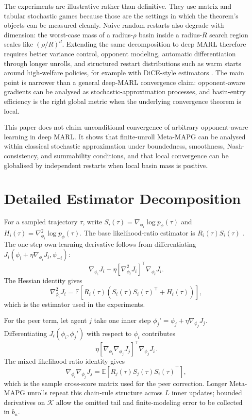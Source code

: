 \documentclass{article}
\theoremstyle{plain}
\theoremstyle{definition}
\theoremstyle{remark}
\newcommand{\E}{\mathbb{E}}
\newcommand{\K}{\mathcal{K}}
\begin{document}
The experiments are illustrative rather than definitive. They use matrix and tabular stochastic games because those are the settings in which the theorem's objects can be measured cleanly. Naive random restarts also degrade with dimension: the worst-case mass of a radius-$\rho$ basin inside a radius-$R$ search region scales like $(\rho/R)^d$. Extending the same decomposition to deep MARL therefore requires better variance control, opponent modeling, automatic differentiation through longer unrolls, and structured restart distributions such as warm starts around high-welfare policies, for example with DiCE-style estimators \citep{foerster2018dice}. The main point is narrower than a general deep-MARL convergence claim: opponent-aware gradients can be analysed as stochastic-approximation processes, and basin-entry efficiency is the right global metric when the underlying convergence theorem is local.

This paper does not claim unconditional convergence of arbitrary opponent-aware learning in deep MARL. It shows that finite-unroll Meta-MAPG can be analysed within classical stochastic approximation under boundedness, smoothness, Nash-consistency, and summability conditions, and that local convergence can be globalised by independent restarts when local basin mass is positive.

\appendix

\section{Detailed Estimator Decomposition}\label{app:decomp}

For a sampled trajectory $\tau$, write $S_i(\tau)=\nabla_{\phi_i}\log p_\phi(\tau)$ and $H_i(\tau)=\nabla_{\phi_i}^2\log p_\phi(\tau)$. The base likelihood-ratio estimator is $R_i(\tau)S_i(\tau)$ \citep{williams1992simple,sutton2018reinforcement}. The one-step own-learning derivative follows from differentiating $J_i(\phi_i+\eta\nabla_{\phi_i}J_i,\phi_{-i})$:
\[
\nabla_{\phi_i}J_i+\eta\left[\nabla_{\phi_i}^2J_i\right]^\top\nabla_{\phi_i}J_i.
\]
The Hessian identity gives
\[
\nabla_{\phi_i}^2J_i
=\E\left[R_i(\tau)\left(S_i(\tau)S_i(\tau)^\top+H_i(\tau)\right)\right],
\]
which is the estimator used in the experiments.

For the peer term, let agent $j$ take one inner step $\phi_j'=\phi_j+\eta\nabla_{\phi_j}J_j$. Differentiating $J_i(\phi_i,\phi_j')$ with respect to $\phi_i$ contributes
\[
\eta\left[\nabla_{\phi_i}\nabla_{\phi_j}J_j\right]^\top\nabla_{\phi_j}J_i.
\]
The mixed likelihood-ratio identity gives
\[
\nabla_{\phi_i}\nabla_{\phi_j}J_j
=\E\left[R_j(\tau)S_j(\tau)S_i(\tau)^\top\right],
\]
which is the sample cross-score matrix used for the peer correction. Longer Meta-MAPG unrolls repeat this chain-rule structure across $L$ inner updates; bounded derivatives on $\K$ allow the omitted tail and finite-modeling error to be collected in $b_n$.
\end{document}
